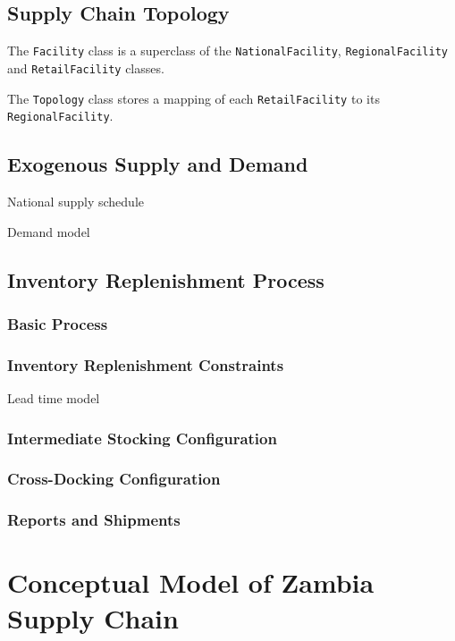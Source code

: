 \documentclass[12pt,twocolumn]{article}
\newcommand{\code}[1]{{\scriptsize \texttt{#1}}}
\begin{document}
\subsection{Supply Chain Topology}

The \code{Facility} class is a superclass of the
\code{NationalFacility}, \code{RegionalFacility}
and \code{RetailFacility} classes.

The \code{Topology} class stores a mapping of each \code{RetailFacility}
to its \code{RegionalFacility}.

\subsection{Exogenous Supply and Demand}

National supply schedule

Demand model

\subsection{Inventory Replenishment Process}

\subsubsection{Basic Process}

\subsubsection{Inventory Replenishment Constraints}

Lead time model

\subsubsection{Intermediate Stocking Configuration}

\subsubsection{Cross-Docking Configuration}

\subsubsection{Reports and Shipments}




\section{Conceptual Model of Zambia Supply Chain}
\end{document}
